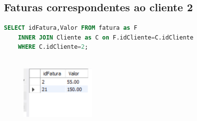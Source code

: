 \subsection{Faturas correspondentes ao cliente 2}
\begin{lstlisting}[language=SQL]
SELECT idFatura,Valor FROM fatura as F
	INNER JOIN Cliente as C on F.idCliente=C.idCliente
    WHERE C.idCliente=2;
    
\end{lstlisting}
\begin{figure}[h]
\begin{center}
\includegraphics[scale=1.0]{implementacao_fisica/Desenho.png} 
\centering
\end{center}
\end{figure}

